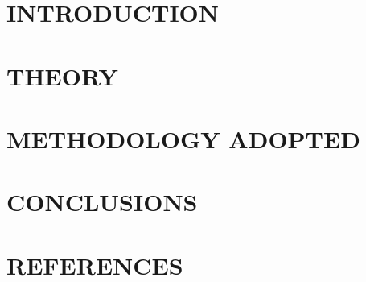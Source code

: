 \documentclass[14pt]{extarticle}
\begin{document}
\setlength{\parskip}{1em}

\newpage
\section{INTRODUCTION}

\newpage
\section{THEORY}


\newpage
\section{METHODOLOGY ADOPTED}

\newpage
\section{CONCLUSIONS}

\newpage
{}
\section*{REFERENCES}
\end{document}
